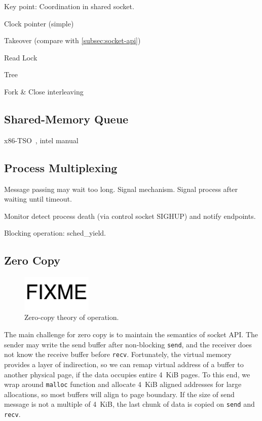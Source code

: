 Key point: Coordination in shared socket.

Clock pointer (simple)

Takeover (compare with \ref{subsec:socket-api})

Read Lock

Tree

Fork \& Close interleaving

\subsection{Shared-Memory Queue}

x86-TSO~\cite{sewell2010x86}, intel manual~\cite{intel-manual}

\subsection{Process Multiplexing}
\label{subsec:epoll}


Message passing may wait too long.
Signal mechanism. Signal process after waiting until timeout.

Monitor detect process death (via control socket SIGHUP) and notify endpoints.

Blocking operation: sched\_yield.


\subsection{Zero Copy}
\label{subsec:zerocopy}

\begin{figure}[t]
	\centering
	\includegraphics[width=0.3\textwidth]{images/fixme}
	\caption{Zero-copy theory of operation.}
	\label{fig:zerocopy}
\end{figure}

The main challenge for zero copy is to maintain the semantics of socket API. The sender may write the send buffer after non-blocking \texttt{send}, and the receiver does not know the receive buffer before \texttt{recv}.
Fortunately, the virtual memory provides a layer of indirection, so we can remap virtual address of a buffer to another physical page, if the data occupies entire 4~KiB pages.
To this end, we wrap around \texttt{malloc} function and allocate 4~KiB aligned addresses for large allocations, so most buffers will align to page boundary.
If the size of send message is not a multiple of 4~KiB, the last chunk of data is copied on \texttt{send} and \texttt{recv}.

